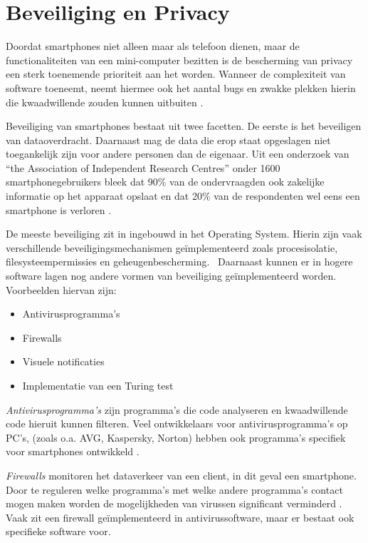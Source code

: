 \chapter{Beveiliging en Privacy}

Doordat smartphones niet alleen maar als telefoon dienen, maar de functionaliteiten van een mini-computer bezitten is de bescherming van privacy een sterk toenemende prioriteit aan het worden. Wanneer de complexiteit van software toeneemt, neemt hiermee ook het aantal bugs en zwakke plekken hierin die kwaadwillende zouden kunnen uitbuiten \citep{portokalidis2010paranoid}. 

Beveiliging van smartphones bestaat uit twee facetten. De eerste is het beveiligen van dataoverdracht. Daarnaast mag de data die erop staat opgeslagen niet toegankelijk zijn voor andere personen dan de eigenaar. Uit een onderzoek van ``the Association of Independent Research Centres'' onder 1600 smartphonegebruikers bleek dat 90\% van de ondervraagden ook zakelijke informatie op het apparaat opslaat en dat 20\% van de respondenten wel eens een smartphone is verloren \citep{charles2011}.  

De meeste beveiliging zit in ingebouwd in het Operating System. Hierin zijn vaak verschillende beveiligingsmechanismen ge\"implementeerd zoals procesisolatie, filesysteempermissies en geheugenbescherming.  Daarnaast kunnen er in hogere software lagen nog andere vormen van beveiliging ge\"implementeerd worden. Voorbeelden hiervan zijn: 

\begin{itemize}
   \item Antivirusprogramma's
   \item Firewalls
   \item Visuele notificaties
   \item Implementatie van een Turing test
\end{itemize}

\emph{Antivirusprogramma's} zijn programma's die code analyseren en kwaadwillende code hieruit kunnen filteren. Veel ontwikkelaars voor antivirusprogramma's op PC's, (zoals o.a. AVG, Kaspersky, Norton) hebben ook programma's specifiek voor smartphones ontwikkeld \citep{becher2009security}. 

\emph{Firewalls} monitoren het dataverkeer van een client, in dit geval een smartphone. Door te reguleren welke programma's met welke andere programma's contact mogen maken worden de mogelijkheden van virussen significant verminderd \citep{becher2009security}. Vaak zit een firewall ge\"implementeerd in antivirussoftware, maar er bestaat ook specifieke software voor. 


